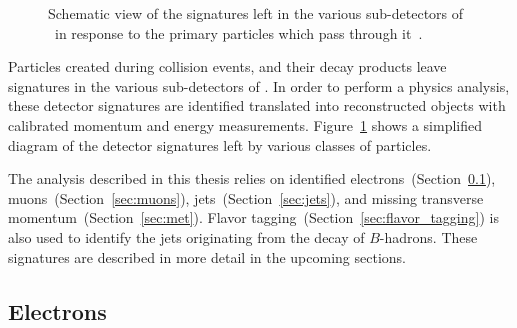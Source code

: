 \begin{figure}[ht]
  \caption{
    Schematic view of the signatures left in the various sub-detectors of
    \atlas\ in response to the primary particles which pass through
    it~\cite{Pequenao:1505342}.
  }
  \label{fig:particle_signatures}
\end{figure}

Particles created during collision events, and their decay products leave
signatures in the various sub-detectors of \atlas.
In order to perform a physics analysis, these detector signatures are identified
translated into reconstructed objects with calibrated momentum and energy
measurements.
Figure~\ref{fig:particle_signatures} shows a simplified diagram of the
detector signatures left by various classes of particles.

The analysis described in this thesis relies on identified
electrons~(Section~\ref{sec:electrons}), muons~(Section~\ref{sec:muons}),
jets~(Section~\ref{sec:jets}), and missing transverse
momentum~(Section~\ref{sec:met}).
Flavor tagging~(Section~\ref{sec:flavor_tagging}) is also used to identify the
jets originating from the decay of $B$-hadrons.
These signatures are described in more detail in the upcoming sections.

\FloatBarrier
\subsection{Electrons} 
\label{sec:electrons}

